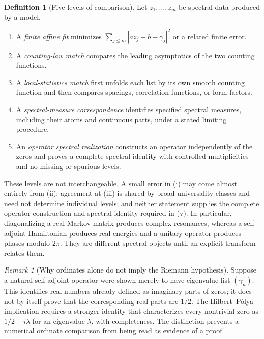 \documentclass[11pt]{article}
\theoremstyle{definition}
\newtheorem{definition}[theorem]{Definition}
\theoremstyle{remark}
\newtheorem{remark}[theorem]{Remark}
\begin{document}
\begin{definition}[Five levels of comparison]\label{def:levels}
Let $z_1,\ldots,z_m$ be spectral data produced by a model.
\begin{enumerate}[label=(\roman*),leftmargin=2.2em]
    \item A \emph{finite affine fit} minimizes $\sum_{j\le m}|a z_j+b-\gamma_j|^2$ or a related finite error.
    \item A \emph{counting-law match} compares the leading asymptotics of the two counting functions.
    \item A \emph{local-statistics match} first unfolds each list by its own smooth counting function and then compares spacings, correlation functions, or form factors.
    \item A \emph{spectral-measure correspondence} identifies specified spectral measures, including their atoms and continuous parts, under a stated limiting procedure.
    \item An \emph{operator spectral realization} constructs an operator independently of the zeros and proves a complete spectral identity with controlled multiplicities and no missing or spurious levels.
\end{enumerate}
\end{definition}

These levels are not interchangeable.  A small error in (i) may come almost entirely from (ii); agreement at (iii) is shared by broad universality classes and need not determine individual levels; and neither statement supplies the complete operator construction and spectral identity required in (v).  In particular, diagonalizing a real Markov matrix produces complex resonances, whereas a self-adjoint Hamiltonian produces real energies and a unitary operator produces phases modulo $2\pi$.  They are different spectral objects until an explicit transform relates them.

\begin{remark}[Why ordinates alone do not imply the Riemann hypothesis]\label{rem:ordinates-rh}
Suppose a natural self-adjoint operator were shown merely to have eigenvalue list $(\gamma_n)$.  This identifies real numbers already defined as imaginary parts of zeros; it does not by itself prove that the corresponding real parts are $1/2$.  The Hilbert--P\'{o}lya implication requires a stronger identity that characterizes every nontrivial zero as $1/2+i\lambda$ for an eigenvalue $\lambda$, with completeness.  The distinction prevents a numerical ordinate comparison from being read as evidence of a proof.
\end{remark}
\end{document}
